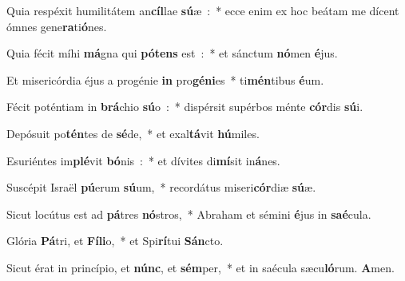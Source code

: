 ﻿\item Quia respéxit humilitátem an\textbf{cíl}\-lae \textbf{sú}\-æ~:~* ecce enim ex hoc beátam me dícent ómnes gene\textbf{ra}ti\textbf{ó}nes.
\item Quia fécit míhi \textbf{má}\-gna qui \textbf{pó}\-\textbf{tens} est~:~* et sánctum \textbf{nó}\-men \textbf{é}jus.
\item Et misericórdia éjus a progénie \textbf{in} pro\textbf{gé}\-\textbf{ni}\-es~* ti\textbf{mén}\-tibus \textbf{é}um.
\item Fécit poténtiam in \textbf{brá}\-chio \textbf{sú}\-o~:~* dispérsit supérbos ménte \textbf{cór}\-dis \textbf{sú}i.
\item Depósuit po\textbf{tén}\-tes de \textbf{sé}\-de,~* et exal\textbf{tá}\-vit \textbf{hú}miles.
\item Esuriéntes im\textbf{plé}\-vit \textbf{bó}\-nis~:~* et dívites di\textbf{mí}\-sit in\textbf{á}nes.
\item Suscépit Israël \textbf{pú}\-erum \textbf{sú}\-um,~* recordátus miseri\textbf{cór}\-diæ \textbf{sú}æ.
\item Sicut locútus est ad \textbf{pá}\-tres \textbf{nó}\-stros,~* Abraham et sémini \textbf{é}\-jus in \textbf{saé}cula.
\item Glória \textbf{Pá}\-tri, et \textbf{Fí}\-\textbf{li}\-o,~* et Spi\textbf{rí}\-tui \textbf{Sán}cto.
\item Sicut érat in princípio, et \textbf{núnc}, et \textbf{sém}\-per,~* et in saécula sæcu\textbf{ló}\-rum. \textbf{A}men.